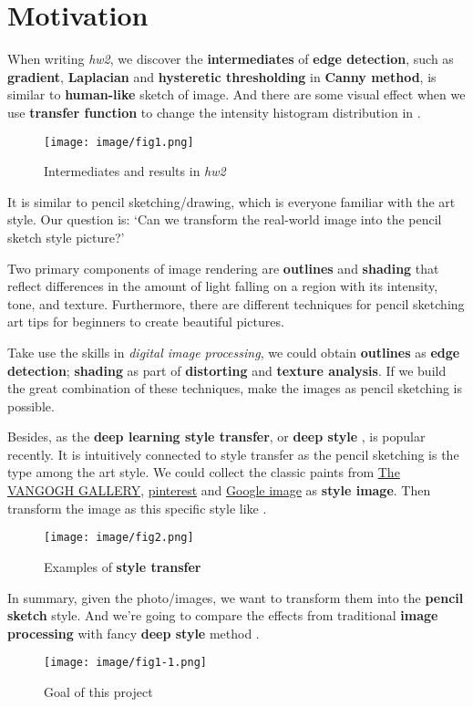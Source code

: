 \section{Motivation}
When writing \textit{hw2}, we discover the \textbf{intermediates} of \textbf{edge detection}, such as \textbf{gradient}, \textbf{Laplacian} and \textbf{hysteretic thresholding} in \textbf{Canny method}, is similar to \textbf{human-like} sketch of image. And there are some visual effect when we use \textbf{transfer function} to change the intensity histogram distribution in .
\begin{figure}
    \centering
    \texttt{[image: image/fig1.png]}
    \caption{Intermediates and results in \textit{hw2}}
    \label{fig1}
\end{figure}
It is similar to \alert{pencil sketching/drawing}, which is everyone familiar with the art style. Our question is: `Can we transform the real-world image into the pencil sketch style picture?'

Two primary components of image rendering are \textbf{outlines} and \textbf{shading} that reflect differences in the amount of light falling on a region with its intensity, tone, and texture. Furthermore, there are different techniques for pencil sketching art tips for beginners to create beautiful pictures.

Take use the skills in \textit{digital image processing}, we could obtain \textbf{outlines} as \textbf{edge detection}; \textbf{shading} as part of \textbf{distorting} and \textbf{texture analysis}. If we build the great combination of these techniques, make the images as pencil sketching is possible.

Besides, as the \textbf{deep learning style transfer}, or \textbf{deep style} \cite{CVPR2016_Gatys_stcnn}, is popular recently. It is intuitively connected to style transfer as the pencil sketching is the type among the art style. We could collect the classic paints from \href{https://www.vangoghgallery.com/catalog/catalog.html}{The VANGOGH GALLERY}, \href{https://www.pinterest.com/}{pinterest} and \href{https://images.google.com/}{Google image} as \textbf{style image}. Then transform the image as this specific style like .
\begin{figure}
    \centering
    \texttt{[image: image/fig2.png]}
    \caption{Examples of \textbf{style transfer}}
    \label{fig2}
\end{figure}

In summary, given the photo/images, we want to transform them into the \textbf{pencil sketch} style. And we’re going to compare the effects from traditional \textbf{image processing} with fancy \textbf{deep style} method .
\begin{figure}
    \centering
    \texttt{[image: image/fig1-1.png]}
    \caption{Goal of this project}
    \label{fig1-1}
\end{figure}
